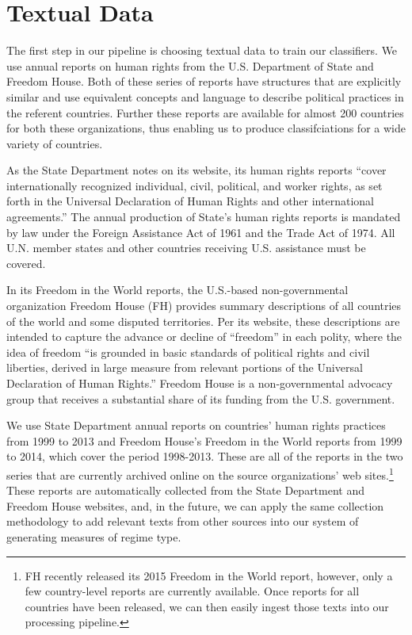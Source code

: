 \documentclass[pdftex,12pt,fullpage,oneside]{amsart}
\begin{document}
\section{Textual Data}

The first step in our pipeline is choosing textual data to train our classifiers. We use annual reports on human rights from the U.S. Department of State and Freedom House. Both of these series of reports have structures that are explicitly similar and use equivalent concepts and language to describe political practices in the referent countries. Further these reports are available for almost 200 countries for both these organizations, thus enabling us to produce classifciations for a wide variety of countries. 

As the State Department notes on its website, its human rights reports ``cover internationally recognized individual, civil, political, and worker rights, as set forth in the Universal Declaration of Human Rights and other international agreements.'' The annual production of State's human rights reports is mandated by law under the Foreign Assistance Act of 1961 and the Trade Act of 1974. All U.N. member states and other countries receiving U.S. assistance must be covered. 

In its Freedom in the World reports, the U.S.-based non-governmental organization Freedom House (FH) provides summary descriptions of all countries of the world and some disputed territories. Per its website, these descriptions are intended to capture the advance or decline of ``freedom'' in each polity, where the idea of freedom ``is grounded in basic standards of political rights and civil liberties, derived in large measure from relevant portions of the Universal Declaration of Human Rights.'' Freedom House is a non-governmental advocacy group that receives a substantial share of its funding from the U.S. government.

We use State Department annual reports on countries' human rights practices from 1999 to 2013 and Freedom House's Freedom in the World reports from 1999 to 2014, which cover the period 1998-2013. These are all of the reports in the two series that are currently archived online on the source organizations' web sites.\footnote{FH recently released its 2015 Freedom in the World report, however, only a few country-level reports are currently available. Once reports for all countries have been released, we can then easily ingest those texts into our processing pipeline.} These reports are automatically collected from the State Department and Freedom House websites, and, in the future, we can apply the same collection methodology to add relevant texts from other sources into our system of generating measures of regime type.
\end{document}
